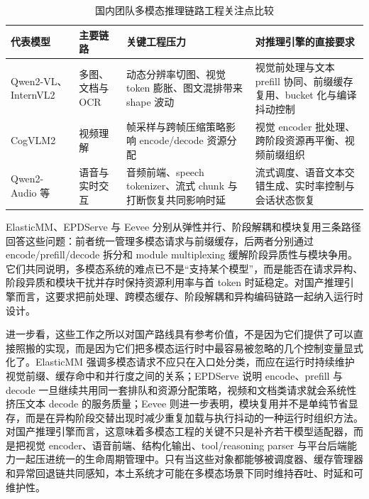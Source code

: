 \begin{table}[t]
\centering
\footnotesize
\setlength{\tabcolsep}{4pt}
\caption{国内团队多模态推理链路工程关注点比较}
\begin{tabularx}{\linewidth}{>{\raggedright\arraybackslash}p{2.2cm}p{1.9cm}p{2.2cm}Y}
\toprule
代表模型 & 主要链路 & 关键工程压力 & 对推理引擎的直接要求 \\
\midrule
Qwen2-VL、InternVL2\citep{wang2024qwen2vl,chen2024internvl2} & 多图、文档与 OCR & 动态分辨率切图、视觉 token 膨胀、图文混排带来 shape 波动 & 视觉前处理与文本 prefill 协同、前缀缓存复用、bucket 化与编译抖动控制 \\
CogVLM2\citep{wang2024cogvlm2} & 视频理解 & 帧采样与跨帧压缩策略影响 encode/decode 资源分配 & 视觉 encoder 批处理、跨阶段资源再平衡、视频前缀组织 \\
Qwen2-Audio 等\citep{chu2024qwen2audio,zeng2024glm4voice,cui2026minicpmo45} & 语音与实时交互 & 音频前端、speech tokenizer、流式 chunk 与打断恢复共同影响时延 & 流式调度、语音文本交错生成、实时率控制与会话状态恢复 \\
\bottomrule
\end{tabularx}
\end{table}

ElasticMM、EPDServe 与 Eevee 分别从弹性并行、阶段解耦和模块复用三条路径回答这些问题：前者统一管理多模态请求与前缀缓存，后两者分别通过 encode/prefill/decode 拆分和 module multiplexing 缓解阶段异质性与模块争用\citep{liu2025elasticmm,singh2025epdserve,hong2026eevee}。它们共同说明，多模态系统的难点已不是“支持某个模型”，而是能否在请求异构、阶段异质和模块干扰并存时保持资源利用率与首 token 时延稳定。对国产推理引擎而言，这要求把前处理、跨模态缓存、阶段解耦和异构编码链路一起纳入运行时设计。

进一步看，这些工作之所以对国产路线具有参考价值，不是因为它们提供了可以直接照搬的实现，而是因为它们把多模态运行时中最容易被忽略的几个控制变量显式化了。ElasticMM 强调多模态请求不应只在入口处分类，而应在运行时持续维护视觉前缀、缓存命中和并行度之间的关系；EPDServe 说明 encode、prefill 与 decode 一旦继续共用同一套排队和资源分配策略，视频和文档类请求就会系统性挤压文本 decode 的服务质量；Eevee 则进一步表明，模块复用并不是单纯节省显存，而是在异构阶段交替出现时减少重复加载与执行抖动的一种运行时组织方法\citep{liu2025elasticmm,singh2025epdserve,hong2026eevee}。对国产推理引擎而言，这意味着多模态工程的关键不只是补齐若干模型适配器，而是把视觉 encoder、语音前端、结构化输出、tool/reasoning parser 与平台后端能力一起压进统一的生命周期管理中。只有当这些对象都能够被调度器、缓存管理器和异常回退链共同感知，本土系统才可能在多模态场景下同时维持吞吐、时延和可维护性。

